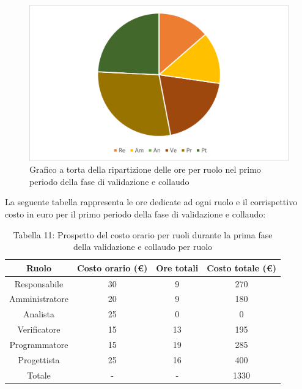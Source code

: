 \begin{figure}[H]
    \centering
    \includegraphics[scale=0.6]{img/grafi preventivo/torta/validazione/periodo1.png}
    \caption{Grafico a torta della ripartizione delle ore per ruolo nel primo periodo della fase di validazione e collaudo}
\end{figure}
La seguente tabella rappresenta le ore dedicate ad ogni ruolo e il corrispettivo costo in euro per il primo periodo della fase di validazione e collaudo:
\begin{table}[h]
	\setlength\extrarowheight{5pt}
	\centering
	\begin{tabularx}{\textwidth}{|ccc|c|}
		\hline
		\rowcolor{white}
		\textbf{Ruolo} & \textbf{Costo orario (€)} & \textbf{Ore totali} & \textbf{Costo totale (€)} \\
		\hline
		Responsabile &30&9&270 \\
		Amministratore &20&9&180 \\
		Analista &25&0&0 \\
		Verificatore &15&13&195 \\
		Programmatore &15&19&285 \\
		Progettista &25&16&400 \\
		\hline
		Totale &-&-&1330 \\
		\hline
	\end{tabularx}
    \vspace{10pt}
	\caption{Tabella 11: Prospetto del costo orario per ruoli durante la prima fase della validazione e collaudo per ruolo}
\end{table}
